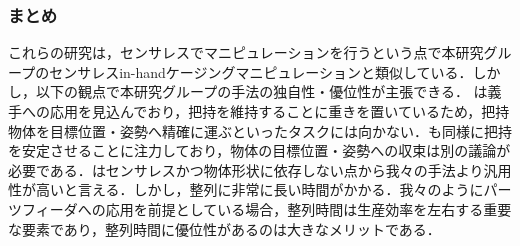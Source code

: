 \documentclass[a4paper,twoside,12pt,papersize, dvipdfmx]{iirthesis}
\begin{document}
\subsubsection{まとめ}
これらの研究は，センサレスでマニピュレーションを行うという点で本研究グループのセンサレスin-handケージングマニピュレーションと類似している．しかし，以下の観点で本研究グループの手法の独自性・優位性が主張できる．
\cite{ospina2020}は義手への応用を見込んでおり，把持を維持することに重きを置いているため，把持物体を目標位置・姿勢へ精確に運ぶといったタスクには向かない．\cite{tahara2013}\cite{tahara2020}も同様に把持を安定させることに注力しており，物体の目標位置・姿勢への収束は別の議論が必要である．\cite{mannam2019}はセンサレスかつ物体形状に依存しない点から我々の手法より汎用性が高いと言える．しかし，整列に非常に長い時間がかかる．我々のようにパーツフィーダへの応用を前提としている場合，整列時間は生産効率を左右する重要な要素であり，整列時間に優位性があるのは大きなメリットである．
\end{document}

